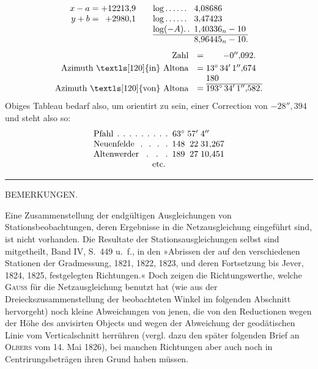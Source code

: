 \[
\begin{array}{@{}r@{\;=\;}r@{\qquad}l@{\enspace}l@{}}
 x-a&+12213{,}9&\log.\,.\,.\,.\,.\,.&4{,}08686\\
 y+b&+2980{,}1&\log.\,.\,.\,.\,.\,.&3{,}47423\\
 \multicolumn{2}{c}{}&\log(-A).\, .&1{,}40336_n-10\\
 \cline{3-4}
 \multicolumn{2}{c}{}&&8{,}96445_n-10.
\end{array}
\]
\[
\begin{array}{@{}r@{\quad}c@{\;}l@{}}
 \text{Zahl}&=&\qquad-0''{,}092.\\[3pt]
 \text{Azimuth \textls[120]{in} Altona}&=&13^\circ\,34'\,1''{,}674\\
 &&180\\
 \cline{3-3}
 \text{Azimuth \textls[120]{von} Altona}&=&193^\circ\,34'\,1''{,}582.
\end{array}
\]
\indent Obiges Tableau bedarf also, um orientirt zu sein, einer Correction von \(-28''{,}394\) und steht also so:
\[
\begin{array}{@{}l@{\enspace}r@{\;}r@{\;}l@{}}
 \text{\hbox to 8.7em{Pfahl\hfil.\hfil.\hfil.\hfil.\hfil.\hfil.\hfil.\hfil.\hfil.}}&63^\circ&57'&4''\\
 \text{\hbox to 8.7em{Neuenfelde\hfil.\hfil.\hfil.\hfil.}}&148&22&31{,}267\\
 \text{\hbox to 8.7em{Altenwerder\hfil.\hfil.\hfil.}}&189&27&10{,}451\\
 \multicolumn{4}{c}{\text{etc.}}
\end{array}
\]

\begin{center}\rule{3cm}{.4pt}\end{center}
\vspace{.8cm}
\begingroup\small
\begin{center}
 BEMERKUNGEN.
\end{center}

Eine Zusammenstellung der endgültigen Ausgleichungen von Stationsbeobachtungen, deren Ergebnisse in die Netzausgleichung eingeführt sind, ist nicht vorhanden. Die Resultate der Stationsausgleichungen selbst sind mitgetheilt, Band IV, S.~449 u.~f., in den »Abrissen der auf den verschiedenen Stationen der Gradmessung, 1821, 1822, 1823, und deren Fortsetzung bis Jever, 1824, 1825, festgelegten Richtungen.« Doch zeigen die Richtungswerthe, welche \textsc{Gauss} für die Netzausgleichung benutzt hat (wie aus der Dreieckszusammenstellung der beobachteten Winkel im folgenden Abschnitt hervorgeht) noch kleine Abweichungen von jenen, die von den Reductionen wegen der Höhe des anvisirten Objects und wegen der Abweichung der geodätischen Linie vom Verticalschnitt herrühren (vergl. dazu den später folgenden Brief an \textsc{Olbers} vom 14. Mai 1826), bei manchen Richtungen aber auch noch in Centrirungsbeträgen ihren Grund haben müssen.

